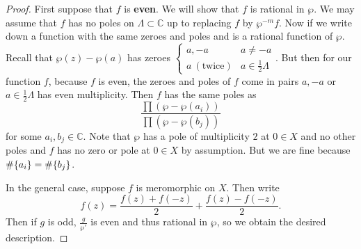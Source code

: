 \documentclass[leqno, openany]{memoir}
\theoremstyle{definition}
\theoremstyle{remark}
\theoremstyle{plain}
\theoremstyle{definition}
\theoremstyle{remark}
\newcommand{\C}{\mathbb{C}}
\begin{document}
\begin{proof} First suppose that $f$ is \textbf{even}. We will show that $f$ is
    rational in $\wp$. We may assume that $f$ has no poles on $\Lambda \subset
    \C$ up to replacing $f$ by $\wp^{-m} f$. Now if we write down a function
    with the same zeroes and poles and is a rational function of $\wp$. Recall
    that $\wp(z) - \wp(a)$ has zeroes $\begin{cases} a, -a & a \neq -a \\ a\
    (\text{twice}) & a \in \frac{1}{2} \Lambda \end{cases}$. But then for our
    function $f$, because $f$ is even, the zeroes and poles of $f$ come in
    pairs $a, -a$ or $a \in \frac{1}{2} \Lambda$ has even multiplicity. Then
    $f$ has the same poles as \[ \frac{\prod (\wp - \wp(a_i))}{\prod (\wp -
    \wp(b_j))} \] for some $a_i, b_j \in \C$. Note that $\wp$ has a pole of
    multiplicity $2$ at $0 \in X$ and no other poles and $f$ has no zero or
    pole at $0 \in X$ by assumption. But we are fine because $\# \qty{a_i} = \#
    \qty{b_j}$.

    In the general case, suppose $f$ is meromorphic on $X$. Then write \[ f(z)
    = \frac{f(z) + f(-z)}{2} + \frac{f(z) - f(-z)}{2}. \] Then if $g$ is odd,
    $\frac{g}{\wp'}$ is even and thus rational in $\wp$, so we obtain the
    desired description.  \end{proof}
\end{document}
